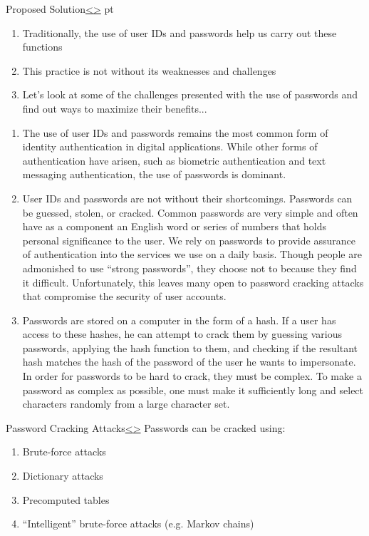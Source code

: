 \documentclass[12pt]{extarticle}
\newenvironment{instructionblock}{\Large\bgroup}{\egroup}
\newcommand{\ben}{\begin{enumerate}}
\newcommand{\een}{\end{enumerate}}
\begin{document}
	
	\pagebreak
	\begin{slide}{Proposed Solution}{\hyperref[slide 2]{\textless}\hyperref[slide 4]{\textgreater}}
		 pt
		\begin{instructionblock}
			\ben
			\item Traditionally, the use of user IDs and passwords help us carry out these functions
			\item This practice is not without its weaknesses and challenges
			\item Let's look at some of the challenges presented with the use of passwords and find out ways to maximize their benefits...
			\een
			
		\end{instructionblock}
	\end{slide}
	\ben
	\item The use of user IDs and passwords remains the most common form of identity authentication in digital applications. While other forms of authentication have arisen, such as biometric authentication and text messaging authentication, the use of passwords is dominant. 
	\item User IDs and passwords are not without their shortcomings. Passwords can be guessed, stolen, or cracked. Common passwords are very simple and often have as a component an English word or series of numbers that holds personal significance to the user. We rely on passwords to provide assurance of authentication into the services we use on a daily basis. Though people are admonished to use ``strong passwords'', they choose not to because they find it difficult. Unfortunately, this leaves many open to password cracking attacks that compromise the security of user accounts. \cite{strongpass}
	\item Passwords are stored on a computer in the form of a hash. If a user has access to these hashes, he can attempt to crack them by guessing various passwords, applying the hash function to them, and checking if the resultant hash matches the hash of the password of the user he wants to impersonate. In order for passwords to be hard to crack, they must be complex. To make a password as complex as possible, one must make it sufficiently long and select characters randomly from a large character set.
	\een
	
	\vfill
	
	\pagebreak
	\begin{slide}{Password Cracking Attacks}{\hyperref[slide 3]{\textless}\hyperref[slide 5]{\textgreater}}
		\vskip 10pt
		\begin{instructionblock}
			Passwords can be cracked using:
			\begin{enumerate}
				\item Brute-force attacks
				\item Dictionary attacks
				\item Precomputed tables
				\item ``Intelligent'' brute-force attacks (e.g. Markov chains)
			\end{enumerate}
		\end{instructionblock}
	\end{slide}
	
\end{document}
